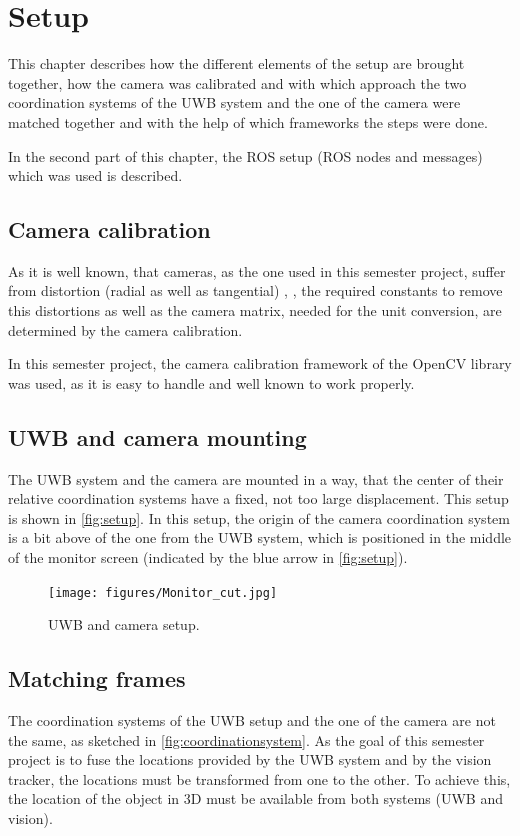 
\setcounter{chapter}{2}

\chapter{Setup}\label{ch:setup}
This chapter describes how the different elements of the setup are brought together, how  the camera was calibrated and with which approach the two coordination systems of the UWB system and the one of the camera were matched together and with the help of which frameworks the steps were done.

In the second part of this chapter, the ROS setup (ROS nodes and messages) which was used is described. 

\section{Camera calibration}
As it is well known, that cameras, as the one used in this semester project, suffer from distortion (radial as well as tangential) \cite{Szeliski:2010:CVA:1941882}, \cite{opencv_library}, the required constants to remove this distortions as well as the camera matrix, needed for the unit conversion, are determined by the camera calibration.

In this semester project, the camera calibration framework of the OpenCV library \cite{opencv_library} was used, as it is easy to handle and well known to work properly.

\section{UWB and camera mounting}
The UWB system and the camera are mounted in a way, that the center of their relative coordination systems have a fixed, not too large displacement. This setup is shown in \autoref{fig:setup}. In this setup, the origin of the camera coordination system is a bit above of the one from the UWB system, which is positioned in the middle of the monitor screen (indicated by the blue arrow in \autoref{fig:setup}). 

\begin{figure}[h]\centering
	\texttt{[image: figures/Monitor\_cut.jpg]}
	\caption{UWB and camera setup.}\label{fig:setup}
\end{figure}

\section{Matching frames}
The coordination systems of the UWB setup and the one of the camera are not the same, as sketched in \autoref{fig:coordinationsystem}. As the goal of this semester project is to fuse the locations provided by the UWB system and by the vision tracker, the locations must be transformed from one to the other. To achieve this, the location of the object in 3D must be available from both systems (UWB and vision).

